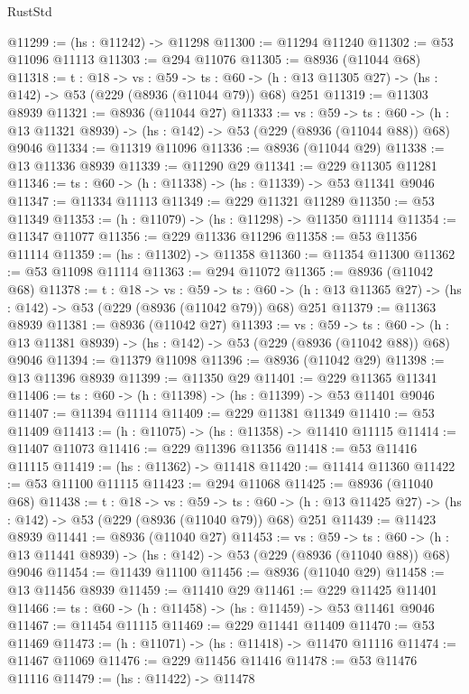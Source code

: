 \begin{lexlean}{RustStd}
\begin{coremodule}
@11299 := (hs : @11242) -> @11298
@11300 := @11294 @11240
@11302 := @53 @11096 @11113
@11303 := @294 @11076
@11305 := @8936 (@11044 @68)
@11318 := {t : @18} ->
  {vs : @59} ->
  {ts : @60} -> (h : @13 @11305 @27) -> (hs : @142) -> @53 (@229 (@8936 (@11044 @79)) @68) @251
@11319 := @11303 @8939
@11321 := @8936 (@11044 @27)
@11333 := {vs : @59} ->
  {ts : @60} -> (h : @13 @11321 @8939) -> (hs : @142) -> @53 (@229 (@8936 (@11044 @88)) @68) @9046
@11334 := @11319 @11096
@11336 := @8936 (@11044 @29)
@11338 := @13 @11336 @8939
@11339 := @11290 @29
@11341 := @229 @11305 @11281
@11346 := {ts : @60} -> (h : @11338) -> (hs : @11339) -> @53 @11341 @9046
@11347 := @11334 @11113
@11349 := @229 @11321 @11289
@11350 := @53 @11349
@11353 := (h : @11079) -> (hs : @11298) -> @11350 @11114
@11354 := @11347 @11077
@11356 := @229 @11336 @11296
@11358 := @53 @11356 @11114
@11359 := (hs : @11302) -> @11358
@11360 := @11354 @11300
@11362 := @53 @11098 @11114
@11363 := @294 @11072
@11365 := @8936 (@11042 @68)
@11378 := {t : @18} ->
  {vs : @59} ->
  {ts : @60} -> (h : @13 @11365 @27) -> (hs : @142) -> @53 (@229 (@8936 (@11042 @79)) @68) @251
@11379 := @11363 @8939
@11381 := @8936 (@11042 @27)
@11393 := {vs : @59} ->
  {ts : @60} -> (h : @13 @11381 @8939) -> (hs : @142) -> @53 (@229 (@8936 (@11042 @88)) @68) @9046
@11394 := @11379 @11098
@11396 := @8936 (@11042 @29)
@11398 := @13 @11396 @8939
@11399 := @11350 @29
@11401 := @229 @11365 @11341
@11406 := {ts : @60} -> (h : @11398) -> (hs : @11399) -> @53 @11401 @9046
@11407 := @11394 @11114
@11409 := @229 @11381 @11349
@11410 := @53 @11409
@11413 := (h : @11075) -> (hs : @11358) -> @11410 @11115
@11414 := @11407 @11073
@11416 := @229 @11396 @11356
@11418 := @53 @11416 @11115
@11419 := (hs : @11362) -> @11418
@11420 := @11414 @11360
@11422 := @53 @11100 @11115
@11423 := @294 @11068
@11425 := @8936 (@11040 @68)
@11438 := {t : @18} ->
  {vs : @59} ->
  {ts : @60} -> (h : @13 @11425 @27) -> (hs : @142) -> @53 (@229 (@8936 (@11040 @79)) @68) @251
@11439 := @11423 @8939
@11441 := @8936 (@11040 @27)
@11453 := {vs : @59} ->
  {ts : @60} -> (h : @13 @11441 @8939) -> (hs : @142) -> @53 (@229 (@8936 (@11040 @88)) @68) @9046
@11454 := @11439 @11100
@11456 := @8936 (@11040 @29)
@11458 := @13 @11456 @8939
@11459 := @11410 @29
@11461 := @229 @11425 @11401
@11466 := {ts : @60} -> (h : @11458) -> (hs : @11459) -> @53 @11461 @9046
@11467 := @11454 @11115
@11469 := @229 @11441 @11409
@11470 := @53 @11469
@11473 := (h : @11071) -> (hs : @11418) -> @11470 @11116
@11474 := @11467 @11069
@11476 := @229 @11456 @11416
@11478 := @53 @11476 @11116
@11479 := (hs : @11422) -> @11478

\end{coremodule}
\end{lexlean}
